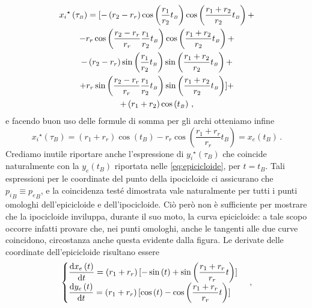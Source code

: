 \begin{multline}
{x_i}^\star\left(\tau_{\scriptscriptstyle B}\right)=
[-\left(r_2-r_r\right)\cos\left({r_1\over{r_2}}t_{\scriptscriptstyle B}\right)\cos\left({{r_1+r_2}\over{r_2}}t_{\scriptscriptstyle B}\right) + \\ -
r_r\cos\left({{r_2-r_r}\over{r_r}}{r_1\over{r_2}}t_{\scriptscriptstyle B}\right)\cos\left({{r_1+r_2}\over{r_2}}t_{\scriptscriptstyle B}\right) + \\ -
\left(r_2-r_r\right)\sin\left({r_1\over{r_2}}t_{\scriptscriptstyle B}\right)\sin\left({{r_1+r_2}\over{r_2}}t_{\scriptscriptstyle B}\right) + \\ +
r_r\sin\left({{r_2-r_r}\over{r_r}}{r_1\over{r_2}}t_{\scriptscriptstyle B}\right)\sin\left({{r_1+r_2}\over{r_2}}t_{\scriptscriptstyle B}\right)] + \\ +
\left(r_1+r_2\right)\cos\left(t_{\scriptscriptstyle B}\right)\,,
\label{eq:inviluppo_x}
\end{multline}
\noindent e facendo buon uso delle formule di somma per gli archi
otteniamo infine
\begin{equation}
{x_i}^\star\left(\tau_{\scriptscriptstyle B}\right)=\left(r_1+r_r\right)\cos\left(t_{\scriptscriptstyle B}\right) -
r_r\cos\left(\dfrac{r_1+r_r}{r_r}t_{\scriptscriptstyle B}\right)=
{x_e}\left(t_{\scriptscriptstyle B}\right)\,.
\label{eq:invdimostrato}
\end{equation}
\noindent Crediamo inutile riportare anche l'espressione
di ${y_i}^\star\left(\tau_{\scriptscriptstyle B}\right)$ che coincide naturalmente
con la
${y_e}\left(t_{\scriptscriptstyle B}\right)$
riportata nelle \ref{eq:epicicloide}, per $t=t_{\scriptscriptstyle B}$.
Tali espressioni per le coordinate del punto della ipocicloide
ci assicurano che
${p_i}_{\scriptscriptstyle B}\equiv{p_e}_{\scriptscriptstyle B}$,
e la coincidenza test\'e dimostrata vale naturalmente per tutti i punti
omologhi dell'epicicloide e dell'ipocicloide.
Ci\`o per\`o non \`e sufficiente per mostrare che la ipocicloide inviluppa,
durante il suo moto, la curva epicicloide:
a tale scopo occorre infatti provare che, nei punti omologhi,
anche le tangenti alle due curve coincidono, circostanza anche
questa evidente dalla figura. Le  derivate delle coordinate dell'epicicloide
risultano essere
\begin{equation}
\begin{cases}
\dfrac{{\rm d}{x_e}\left(t\right)}{{\rm d}t} = 
\left(r_1+r_r\right)
[-\sin\left(t\right) +
\sin\left(\dfrac{r_1+r_r}{r_r}t\right)] \\
\dfrac{{\rm d}{y_e}\left(t\right)}{{\rm d}t} = 
\left(r_1+r_r\right)
[\cos\left(t\right) -
\cos\left(\dfrac{r_1+r_r}{r_r}t\right)]
\end{cases}\,,
\label{eq:depicicloide}
\end{equation}

